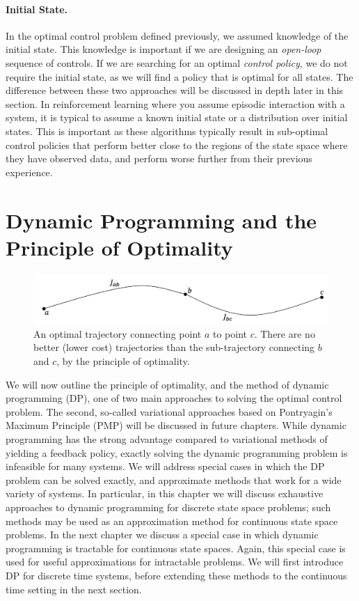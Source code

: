\paragraph{Initial State.} In the optimal control problem defined previously, we assumed knowledge of the initial state. This knowledge is important if we are designing an \textit{open-loop} sequence of controls. If we are searching for an optimal \textit{control policy}, we do not require the initial state, as we will find a policy that is optimal for all states. The difference between these two approaches will be discussed in depth later in this section. In reinforcement learning where you assume episodic interaction with a system, it is typical to assume a known initial state or a distribution over initial states. This is important as these algorithms typically result in sub-optimal control policies that perform better close to the regions of the state space where they have observed data, and perform worse further from their previous experience. 

\section{Dynamic Programming and the Principle of Optimality}

\begin{figure}[t]
    \centering
    \includegraphics[width=0.8\linewidth]{figs/optimality.png}
    \caption{An optimal trajectory connecting point $a$ to point $c$. There are no better (lower cost) trajectories than the sub-trajectory connecting $b$ and $c$, by the principle of optimality.}
    \label{fig:opt1}
\end{figure}

We will now outline the principle of optimality, and the method of dynamic programming (DP), one of two main approaches to solving the optimal control problem. The second, so-called variational approaches based on Pontryagin's Maximum Principle (PMP) will be discussed in future chapters. While dynamic programming has the strong advantage compared to variational methods of yielding a feedback policy, exactly solving the dynamic programming problem is infeasible for many systems. We will address special cases in which the DP problem can be solved exactly, and approximate methods that work for a wide variety of systems. In particular, in this chapter we will discuss exhaustive approaches to dynamic programming for discrete state space problems; such methods may be used as an approximation method for continuous state space problems. In the next chapter we discuss a special case in which dynamic programming is tractable for continuous state spaces. Again, this special case is used for useful approximations for intractable problems. 
We will first introduce DP for discrete time systems, before extending these methods to the continuous time setting in the next section.

